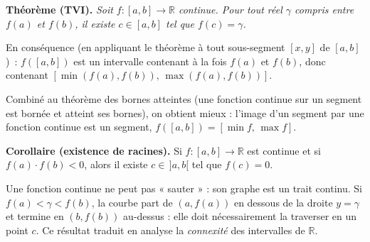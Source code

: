 ﻿%



\begin{tcolorbox}[thmbox]
  \textbf{Théorème (TVI).}\enspace{}
  \textit{Soit $f : [a,b] \to \mathbb{R}$ continue. Pour tout réel $\gamma$
  compris entre $f(a)$ et $f(b)$, il existe $c \in [a,b]$ tel que $f(c) = \gamma$.}

  \medskip
  En conséquence (en appliquant le théorème à tout sous-segment $[x,y]$ de
  $[a,b]$)~: $f([a,b])$ est un intervalle contenant à la fois $f(a)$ et
  $f(b)$, donc contenant $[\min(f(a),f(b)),\,\max(f(a),f(b))]$.

  \medskip
  Combiné au théorème des bornes atteintes (une fonction continue sur un segment est bornée et atteint ses
  bornes), on obtient mieux : l'image d'un segment par une fonction continue
  est un segment, $f([a,b]) = [\min f,\, \max f]$.

  \medskip
  \textbf{Corollaire (existence de racines).}\enspace%
  Si $f : [a,b] \to \mathbb{R}$ est continue et si $f(a)\cdot f(b) < 0$,
  alors il existe $c \in\, ]a,b[$ tel que $f(c) = 0$.
\end{tcolorbox}

\begin{significationintuitive}
Une fonction continue ne peut pas « sauter » : son graphe est un trait
continu. Si $f(a) < \gamma < f(b)$, la courbe part de $(a, f(a))$ en dessous
de la droite $y = \gamma$ et termine en $(b, f(b))$ au-dessus : elle doit
nécessairement la traverser en un point $c$. Ce résultat traduit en analyse la
\emph{connexité} des intervalles de
$\mathbb{R}$.
\end{significationintuitive}

\decsep{}


